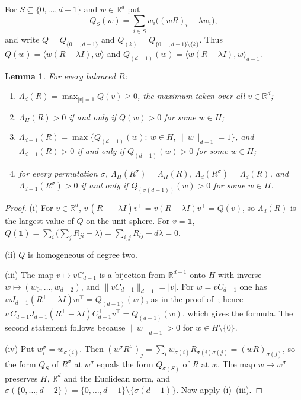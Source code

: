 \documentclass[11pt]{amsart}
\newtheorem{lemma}[theorem]{Lemma}
\theoremstyle{definition}
\theoremstyle{remark}
\newcommand{\R}{\mathbb R}
\newcommand{\one}{\mathbf 1}
\begin{document}
For $S\subseteq\{0,\dots,d-1\}$ and $w\in\R^d$ put
\[
Q_S(w)=\sum_{i\in S}w_i\big((wR)_i-\lambda w_i\big),
\]
and write $Q=Q_{\{0,\dots,d-1\}}$ and $Q_{(k)}=Q_{\{0,\dots,d-1\}\setminus\{k\}}$. Thus $Q(w)=\langle w(R-\lambda I),w\rangle$ and $Q_{(d-1)}(w)=\langle w(R-\lambda I),w\rangle_{d-1}$.

\begin{lemma}\label{lem:readings}
For every balanced $R$:
\begin{enumerate}[label=\textup{(\roman*)}]
\item $\Lambda_d(R)=\max_{|v|=1}Q(v)\ge 0$, the maximum taken over all $v\in\R^d$;
\item $\Lambda_H(R)>0$ if and only if $Q(w)>0$ for some $w\in H$;
\item $\Lambda_{d-1}(R)=\max\{Q_{(d-1)}(w):\ w\in H,\ \|w\|_{d-1}=1\}$, and $\Lambda_{d-1}(R)>0$ if and only if $Q_{(d-1)}(w)>0$ for some $w\in H$;
\item for every permutation $\sigma$, $\Lambda_H(R^\sigma)=\Lambda_H(R)$, $\Lambda_d(R^\sigma)=\Lambda_d(R)$, and $\Lambda_{d-1}(R^\sigma)>0$ if and only if $Q_{(\sigma(d-1))}(w)>0$ for some $w\in H$.
\end{enumerate}
\end{lemma}

\begin{proof}
(i) For $v\in\R^d$, $v\,(R^{\top}-\lambda I)v^{\top}=v(R-\lambda I)v^{\top}=Q(v)$, so $\Lambda_d(R)$ is the largest value of $Q$ on the unit sphere. For $v=\one$, $Q(\one)=\sum_i\big(\sum_jR_{ji}-\lambda\big)=\sum_{i,j}R_{ij}-d\lambda=0$.

(ii) $Q$ is homogeneous of degree two.

(iii) The map $v\mapsto vC_{d-1}$ is a bijection from $\R^{d-1}$ onto $H$ with inverse $w\mapsto(w_0,\dots,w_{d-2})$, and $\|vC_{d-1}\|_{d-1}=|v|$. For $w=vC_{d-1}$ one has $wJ_{d-1}(R^{\top}-\lambda I)w^{\top}=Q_{(d-1)}(w)$, as in the proof of~\cite[Proposition~3.6]{NP}; hence $v\,C_{d-1}J_{d-1}(R^{\top}-\lambda I)C_{d-1}^{\top}v^{\top}=Q_{(d-1)}(w)$, which gives the formula. The second statement follows because $\|w\|_{d-1}>0$ for $w\in H\setminus\{0\}$.

(iv) Put $w^\sigma_i=w_{\sigma(i)}$. Then $(w^\sigma R^\sigma)_j=\sum_iw_{\sigma(i)}R_{\sigma(i)\sigma(j)}=(wR)_{\sigma(j)}$, so the form $Q_S$ of $R^\sigma$ at $w^\sigma$ equals the form $Q_{\sigma(S)}$ of $R$ at $w$. The map $w\mapsto w^\sigma$ preserves $H$, $\R^d$ and the Euclidean norm, and $\sigma(\{0,\dots,d-2\})=\{0,\dots,d-1\}\setminus\{\sigma(d-1)\}$. Now apply (i)--(iii).
\end{proof}
\end{document}
